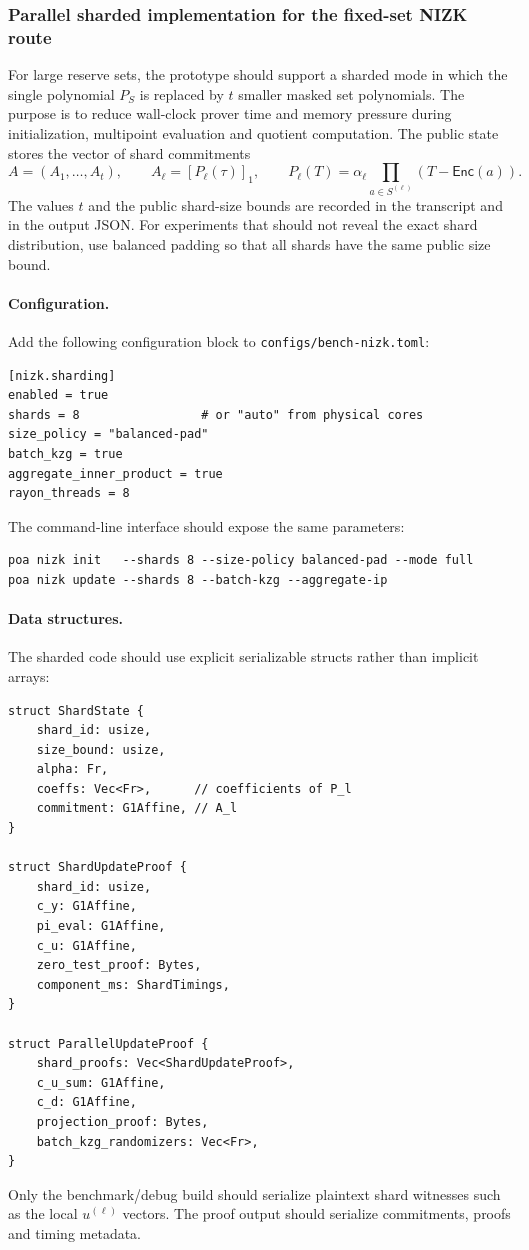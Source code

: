 \documentclass[UTF8,a4paper,11pt]{ctexart}
\newcommand{\Enc}{\mathsf{Enc}}
\begin{document}
\subsubsection{Parallel sharded implementation for the fixed-set NIZK route}\label{sec:impl-parallel-nizk}

For large reserve sets, the prototype should support a sharded mode in which the single polynomial
$P_S$ is replaced by $t$ smaller masked set polynomials.  The purpose is to reduce wall-clock prover
time and memory pressure during initialization, multipoint evaluation and quotient computation.
The public state stores the vector of shard commitments
\[
  A=(A_1,\ldots,A_t),
  \qquad
  A_\ell=[P_\ell(\tau)]_1,
  \qquad
  P_\ell(T)=\alpha_\ell\prod_{a\in S^{(\ell)}}(T-\Enc(a)).
\]
The values $t$ and the public shard-size bounds are recorded in the transcript and in the output JSON.
For experiments that should not reveal the exact shard distribution, use balanced padding so that all
shards have the same public size bound.

\paragraph{Configuration.}
Add the following configuration block to \texttt{configs/bench-nizk.toml}:
\begin{lstlisting}
[nizk.sharding]
enabled = true
shards = 8                 # or "auto" from physical cores
size_policy = "balanced-pad"
batch_kzg = true
aggregate_inner_product = true
rayon_threads = 8
\end{lstlisting}
The command-line interface should expose the same parameters:
\begin{lstlisting}
poa nizk init   --shards 8 --size-policy balanced-pad --mode full
poa nizk update --shards 8 --batch-kzg --aggregate-ip
\end{lstlisting}

\paragraph{Data structures.}
The sharded code should use explicit serializable structs rather than implicit arrays:
\begin{lstlisting}
struct ShardState {
    shard_id: usize,
    size_bound: usize,
    alpha: Fr,
    coeffs: Vec<Fr>,      // coefficients of P_l
    commitment: G1Affine, // A_l
}

struct ShardUpdateProof {
    shard_id: usize,
    c_y: G1Affine,
    pi_eval: G1Affine,
    c_u: G1Affine,
    zero_test_proof: Bytes,
    component_ms: ShardTimings,
}

struct ParallelUpdateProof {
    shard_proofs: Vec<ShardUpdateProof>,
    c_u_sum: G1Affine,
    c_d: G1Affine,
    projection_proof: Bytes,
    batch_kzg_randomizers: Vec<Fr>,
}
\end{lstlisting}
Only the benchmark/debug build should serialize plaintext shard witnesses such as the local
$u^{(\ell)}$ vectors.  The proof output should serialize commitments, proofs and timing metadata.
\end{document}
